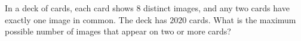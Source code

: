 In a deck of cards, each card shows $8$ distinct images, and any two cards have exactly one image in common. The deck has $2020$ cards. What is the maximum possible number of images that appear on two or more cards?

